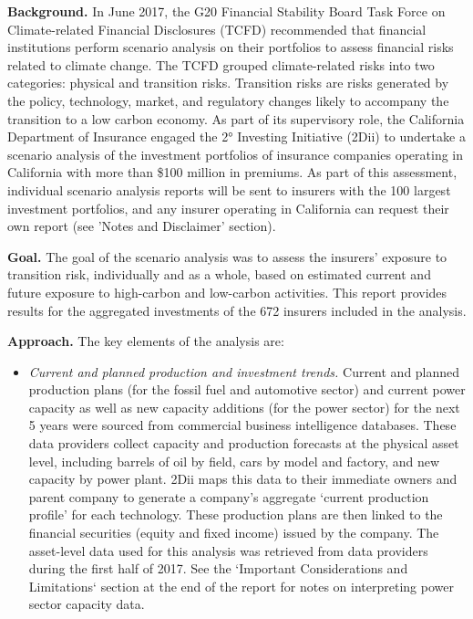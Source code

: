 \documentclass[10pt,table,a4]{article}\usepackage[]{graphicx}\usepackage[]{color}
\begin{document}
	\begin{multicols}{2}
		\textbf{Background.} In June 2017, the G20 Financial Stability Board Task Force on Climate-related Financial Disclosures (TCFD) recommended that financial institutions perform scenario analysis on their portfolios to assess financial risks related to climate change. The TCFD grouped climate-related risks into two categories: physical and transition risks. Transition risks are risks generated by the policy, technology, market, and regulatory changes likely to accompany the transition to a low carbon economy. As part of its supervisory role, the California Department of Insurance engaged the 2° Investing Initiative (2Dii) to undertake a scenario analysis of the investment portfolios of insurance companies operating in California with more than \$100 million in premiums.  As part of this assessment, individual scenario analysis reports will be sent to insurers with the 100 largest investment portfolios, and any insurer operating in California can request their own report (see ’Notes and Disclaimer’ section).
		
		\textbf{Goal.} The goal of the scenario analysis was to assess the insurers’ exposure to transition risk, individually and as a whole, based on estimated current and future exposure to high-carbon and low-carbon activities. This report provides results for the aggregated investments of the 672 insurers included in the analysis.  
		
		\textbf{Approach.} The key elements of the analysis are:
		
		\begin{itemize}
			\item{\textit{Current and planned production and investment trends.} Current and planned production plans (for the fossil fuel and automotive sector) and current power capacity as well as new capacity additions (for the power sector) for the next 5 years were sourced from commercial business intelligence databases. These data providers collect capacity and production forecasts at the physical asset level, including barrels of oil by field, cars by model and factory, and new capacity by power plant. 2Dii maps this data to their immediate owners and parent company to generate a company’s aggregate ‘current production profile’ for each technology. These production plans are then linked to the financial securities (equity and fixed income) issued by the company. The asset-level data used for this analysis was retrieved from data providers during the first half of 2017. See the ‘Important Considerations and Limitations‘ section at the end of the report for notes on interpreting power sector capacity data.}
			

\end{itemize}
\end{multicols}
\end{document}
